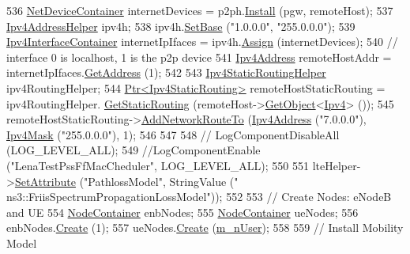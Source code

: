\begin{DoxyCode}
536   \hyperlink{classns3_1_1NetDeviceContainer}{NetDeviceContainer} internetDevices = p2ph.\hyperlink{classns3_1_1PointToPointHelper_ab9162fea3e88722666fed1106df1f9ec}{Install} (pgw, remoteHost);
537   \hyperlink{classns3_1_1Ipv4AddressHelper}{Ipv4AddressHelper} ipv4h;
538   ipv4h.\hyperlink{classns3_1_1Ipv4AddressHelper_acf7b16dd25bac67e00f5e25f90a9a035}{SetBase} (\textcolor{stringliteral}{"1.0.0.0"}, \textcolor{stringliteral}{"255.0.0.0"});
539   \hyperlink{classns3_1_1Ipv4InterfaceContainer}{Ipv4InterfaceContainer} internetIpIfaces = ipv4h.\hyperlink{classns3_1_1Ipv4AddressHelper_af8e7f4a1a7e74c00014a1eac445a27af}{Assign} (internetDevices);
540   \textcolor{comment}{// interface 0 is localhost, 1 is the p2p device}
541   \hyperlink{classns3_1_1Ipv4Address}{Ipv4Address} remoteHostAddr = internetIpIfaces.\hyperlink{classns3_1_1Ipv4InterfaceContainer_ae63208dcd222be986822937ee4aa828c}{GetAddress} (1);
542 
543   \hyperlink{classns3_1_1Ipv4StaticRoutingHelper}{Ipv4StaticRoutingHelper} ipv4RoutingHelper;
544   \hyperlink{classns3_1_1Ptr}{Ptr<Ipv4StaticRouting>} remoteHostStaticRouting = ipv4RoutingHelper.
      \hyperlink{classns3_1_1Ipv4StaticRoutingHelper_a731206e50d305695dac7fb2ef963a4bb}{GetStaticRouting} (remoteHost->\hyperlink{classns3_1_1Object_a13e18c00017096c8381eb651d5bd0783}{GetObject}<\hyperlink{classns3_1_1Ipv4}{Ipv4}> ());
545   remoteHostStaticRouting->\hyperlink{classns3_1_1Ipv4StaticRouting_a8bf5eaa7ba49fe33c78c70d5560b6c39}{AddNetworkRouteTo} (\hyperlink{classns3_1_1Ipv4Address}{Ipv4Address} (\textcolor{stringliteral}{"7.0.0.0"}), 
      \hyperlink{classns3_1_1Ipv4Mask}{Ipv4Mask} (\textcolor{stringliteral}{"255.0.0.0"}), 1);
546 
547 
548 \textcolor{comment}{//   LogComponentDisableAll (LOG\_LEVEL\_ALL);}
549   \textcolor{comment}{//LogComponentEnable ("LenaTestPssFfMacCheduler", LOG\_LEVEL\_ALL);}
550    
551   lteHelper->\hyperlink{classns3_1_1ObjectBase_ac60245d3ea4123bbc9b1d391f1f6592f}{SetAttribute} (\textcolor{stringliteral}{"PathlossModel"}, StringValue (\textcolor{stringliteral}{"
      ns3::FriisSpectrumPropagationLossModel"}));
552 
553   \textcolor{comment}{// Create Nodes: eNodeB and UE}
554   \hyperlink{classns3_1_1NodeContainer}{NodeContainer} enbNodes;
555   \hyperlink{classns3_1_1NodeContainer}{NodeContainer} ueNodes;
556   enbNodes.\hyperlink{classns3_1_1NodeContainer_a787f059e2813e8b951cc6914d11dfe69}{Create} (1);
557   ueNodes.\hyperlink{classns3_1_1NodeContainer_a787f059e2813e8b951cc6914d11dfe69}{Create} (\hyperlink{classLenaPssFfMacSchedulerTestCase2_a4d4431bc9cfea75e5f20c9aec63b97fe}{m\_nUser});
558 
559   \textcolor{comment}{// Install Mobility Model}

\end{DoxyCode}
